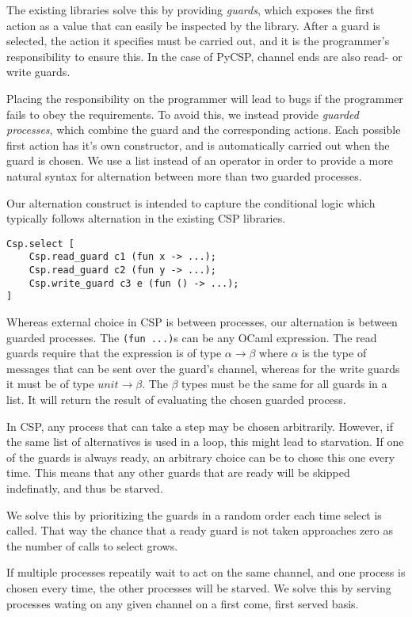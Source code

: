 \documentclass[a4paper,12pt]{article}
\begin{document}
The existing libraries solve this by providing \emph{guards}, which exposes the first action as a value 
that can easily be inspected by the library. After a guard is selected, the action it specifies must be 
carried out, and it is the programmer's responsibility to ensure this. In the case of PyCSP, channel
ends are also read- or write guards. 

Placing the responsibility on the programmer will lead to bugs if the programmer fails to obey the 
requirements. To avoid this, we instead provide \emph{guarded processes}, which combine the guard and
the corresponding actions. Each possible first action has it's own constructor, and is automatically 
carried out when the guard is chosen. We use a list instead of an operator in order to provide a more 
natural syntax for alternation between more than two guarded processes.

Our alternation construct is intended to capture the conditional logic which typically follows 
alternation in the existing CSP libraries.

\begin{verbatim}
Csp.select [
    Csp.read_guard c1 (fun x -> ...);
    Csp.read_guard c2 (fun y -> ...);
    Csp.write_guard c3 e (fun () -> ...);
]
\end{verbatim}

Whereas external choice in CSP is between processes, our alternation is between guarded processes.
The \verb|(fun ...)|s can be any OCaml expression. The read guards require that the expression is of type
$\alpha \to \beta$ where $\alpha$ is the type of messages that can be sent over the guard's channel, whereas
for the write guards it must be of type $unit \to \beta$. The $\beta$ types must be the same for all guards in 
a list. It will return the result of evaluating the chosen guarded process.

In CSP, any process that can take a step may be chosen arbitrarily. However, if the same list of 
alternatives is used in a loop, this might lead to starvation. If one of the guards is always ready,
an arbitrary choice can be to chose this one every time. This means that any other guards that are 
ready will be skipped indefinatly, and thus be starved.

We solve this by prioritizing the guards in a random order each time select is called. That way the
chance that a ready guard is not taken approaches zero as the number of calls to select grows.

If multiple processes repeatily wait to act on the same channel, and one process is chosen every time,
the other processes will be starved. We solve this by serving processes wating on any given channel
on a first come, first served basis.
\end{document}
